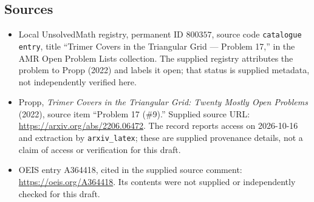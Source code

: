 \documentclass[11pt]{article}
\begin{document}
\subsection{Sources}
\begin{itemize}
\item Local UnsolvedMath registry, permanent ID \(800357\), source code \texttt{catalogue entry}, title ``Trimer Covers in the Triangular Grid --- Problem 17,'' in the AMR Open Problem Lists collection. The supplied registry attributes the problem to Propp (2022) and labels it open; that status is supplied metadata, not independently verified here.
\item Propp, \emph{Trimer Covers in the Triangular Grid: Twenty Mostly Open Problems} (2022), source item ``Problem 17 (\#9).'' Supplied source URL: \url{https://arxiv.org/abs/2206.06472}. The record reports access on 2026-10-16 and extraction by \texttt{arxiv\_latex}; these are supplied provenance details, not a claim of access or verification for this draft.
\item OEIS entry A364418, cited in the supplied source comment: \url{https://oeis.org/A364418}. Its contents were not supplied or independently checked for this draft.
\end{itemize}
\end{document}
